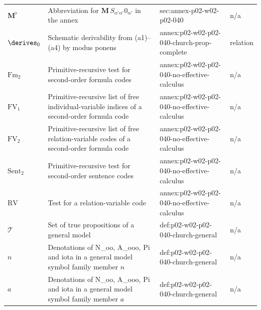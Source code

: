 \begin{longtable}{@{}p{}p{}p{}p{}@{}}
\(\mathbf M^\flat\) & Abbreviation for \(\mathbf M\,S_{\alpha'\alpha'}0_{\alpha'}\) in the annex & sec:\allowbreak{}annex-\allowbreak{}p02-\allowbreak{}w02-\allowbreak{}p02-\allowbreak{}040 & n/a \\
\(\derives_0\) & Schematic derivability from (a1)--(a4) by modus ponens & annex:\allowbreak{}p02-\allowbreak{}w02-\allowbreak{}p02-\allowbreak{}040-\allowbreak{}church-\allowbreak{}prop-\allowbreak{}complete & relation \\
\(\mathrm{Fm}_2\) & Primitive-recursive test for second-order formula codes & annex:\allowbreak{}p02-\allowbreak{}w02-\allowbreak{}p02-\allowbreak{}040-\allowbreak{}no-\allowbreak{}effective-\allowbreak{}calculus & n/a \\
\(\mathrm{FV}_1\) & Primitive-recursive list of free individual-variable indices of a second-order formula code & annex:\allowbreak{}p02-\allowbreak{}w02-\allowbreak{}p02-\allowbreak{}040-\allowbreak{}no-\allowbreak{}effective-\allowbreak{}calculus & n/a \\
\(\mathrm{FV}_2\) & Primitive-recursive list of free relation-variable codes of a second-order formula code & annex:\allowbreak{}p02-\allowbreak{}w02-\allowbreak{}p02-\allowbreak{}040-\allowbreak{}no-\allowbreak{}effective-\allowbreak{}calculus & n/a \\
\(\mathrm{Sent}_2\) & Primitive-recursive test for second-order sentence codes & annex:\allowbreak{}p02-\allowbreak{}w02-\allowbreak{}p02-\allowbreak{}040-\allowbreak{}no-\allowbreak{}effective-\allowbreak{}calculus & n/a \\
\(\mathrm{RV}\) & Test for a relation-variable code & annex:\allowbreak{}p02-\allowbreak{}w02-\allowbreak{}p02-\allowbreak{}040-\allowbreak{}no-\allowbreak{}effective-\allowbreak{}calculus & n/a \\
\(\mathcal T\) & Set of true propositions of a general model & def:\allowbreak{}p02-\allowbreak{}w02-\allowbreak{}p02-\allowbreak{}040-\allowbreak{}church-\allowbreak{}general & n/a \\
\(n\) & Denotations of N\_oo, A\_ooo, Pi and iota in a general model symbol family member \(n\) & def:\allowbreak{}p02-\allowbreak{}w02-\allowbreak{}p02-\allowbreak{}040-\allowbreak{}church-\allowbreak{}general & n/a \\
\(a\) & Denotations of N\_oo, A\_ooo, Pi and iota in a general model symbol family member \(a\) & def:\allowbreak{}p02-\allowbreak{}w02-\allowbreak{}p02-\allowbreak{}040-\allowbreak{}church-\allowbreak{}general & n/a \\

\end{longtable}
